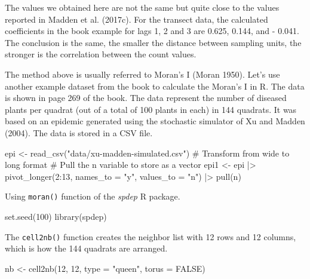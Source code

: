 \documentclass[
  letterpaper,
  DIV=11,
  numbers=noendperiod]{scrreprt}
\newenvironment{Shaded}{\begin{snugshade}}{\end{snugshade}}
\newcommand{\AttributeTok}[1]{\textcolor[rgb]{0.40,0.45,0.13}{#1}}
\newcommand{\CommentTok}[1]{\textcolor[rgb]{0.37,0.37,0.37}{#1}}
\newcommand{\ConstantTok}[1]{\textcolor[rgb]{0.56,0.35,0.01}{#1}}
\newcommand{\DecValTok}[1]{\textcolor[rgb]{0.68,0.00,0.00}{#1}}
\newcommand{\FunctionTok}[1]{\textcolor[rgb]{0.28,0.35,0.67}{#1}}
\newcommand{\NormalTok}[1]{\textcolor[rgb]{0.00,0.23,0.31}{#1}}
\newcommand{\OtherTok}[1]{\textcolor[rgb]{0.00,0.23,0.31}{#1}}
\newcommand{\SpecialCharTok}[1]{\textcolor[rgb]{0.37,0.37,0.37}{#1}}
\newcommand{\StringTok}[1]{\textcolor[rgb]{0.13,0.47,0.30}{#1}}
\begin{document}
The values we obtained here are not the same but quite close to the
values reported in Madden et al. (2017c). For the transect data, the
calculated coefficients in the book example for lags 1, 2 and 3 are
0.625, 0.144, and - 0.041. The conclusion is the same, the smaller the
distance between sampling units, the stronger is the correlation between
the count values.

The method above is usually referred to Moran's I (Moran 1950). Let's
use another example dataset from the book to calculate the Moran's I in
R. The data is shown in page 269 of the book. The data represent the
number of diseased plants per quadrat (out of a total of 100 plants in
each) in 144 quadrats. It was based on an epidemic generated using the
stochastic simulator of Xu and Madden (2004). The data is stored in a
CSV file.

\begin{Shaded}
\begin{Highlighting}[]
\NormalTok{epi }\OtherTok{\textless{}{-}} \FunctionTok{read\_csv}\NormalTok{(}\StringTok{"data/xu{-}madden{-}simulated.csv"}\NormalTok{)}
\CommentTok{\# Transform from wide to long format}
\CommentTok{\# Pull the n variable to store as a vector}
\NormalTok{epi1 }\OtherTok{\textless{}{-}}\NormalTok{ epi }\SpecialCharTok{|\textgreater{}}
  \FunctionTok{pivot\_longer}\NormalTok{(}\DecValTok{2}\SpecialCharTok{:}\DecValTok{13}\NormalTok{,}
               \AttributeTok{names\_to =} \StringTok{"y"}\NormalTok{,}
               \AttributeTok{values\_to =} \StringTok{"n"}\NormalTok{) }\SpecialCharTok{|\textgreater{}}
  \FunctionTok{pull}\NormalTok{(n)}
\end{Highlighting}
\end{Shaded}

Using \texttt{moran()} function of the \emph{spdep} R package.

\begin{Shaded}
\begin{Highlighting}[]
\FunctionTok{set.seed}\NormalTok{(}\DecValTok{100}\NormalTok{)}
\FunctionTok{library}\NormalTok{(spdep)}
\end{Highlighting}
\end{Shaded}

The \texttt{cell2nb()} function creates the neighbor list with 12 rows
and 12 columns, which is how the 144 quadrats are arranged.

\begin{Shaded}
\begin{Highlighting}[]
\NormalTok{nb }\OtherTok{\textless{}{-}} \FunctionTok{cell2nb}\NormalTok{(}\DecValTok{12}\NormalTok{, }\DecValTok{12}\NormalTok{, }\AttributeTok{type =} \StringTok{"queen"}\NormalTok{, }\AttributeTok{torus =} \ConstantTok{FALSE}\NormalTok{)}
\end{Highlighting}
\end{Shaded}
\end{document}
